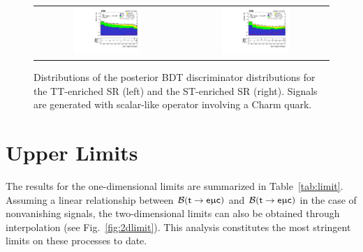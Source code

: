 \begin{figure}[tbh!]
 \begin{center}
 \begin{tabular}{cc}
  \includegraphics[width=0.48\textwidth]{figures/Part3/Results/BDT_TT_ScalarC}&
  \includegraphics[width=0.48\textwidth]{figures/Part3/Results/BDT_ST_ScalarC}\\
 \end{tabular}
 \caption{Distributions of the posterior BDT discriminator distributions for the TT-enriched SR (left) and the ST-enriched SR (right). Signals are generated with scalar-like operator involving a Charm quark.}
 \label{fig:bdt_postfit_ScalarC}
 \end{center}
\end{figure} 
\section{Upper Limits}
\label{sec:Limits}

The results for the one-dimensional limits are summarized in Table~\ref{tab:limit}. Assuming a linear relationship between $\mathcal{B}(\textsf{t}\rightarrow\textsf{e}\upmu\textsf{c})$ and $\mathcal{B}(\textsf{t}\rightarrow\textsf{e}\upmu\textsf{c})$ in the case of nonvanishing signals, the two-dimensional limits can also be obtained through interpolation (see Fig.~\ref{fig:2dlimit}). This analysis constitutes the most stringent limits on these processes to date.

